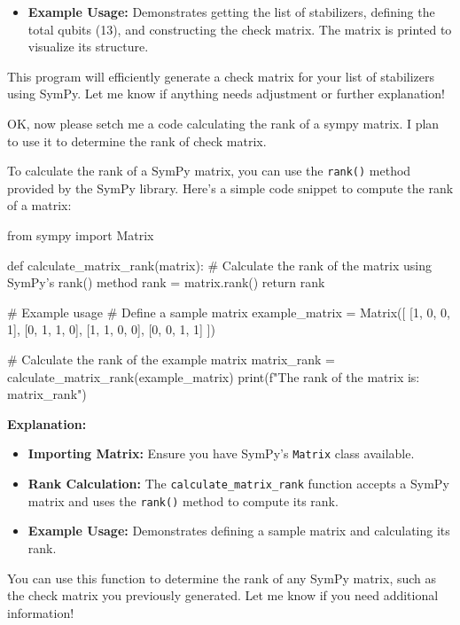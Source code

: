 \begin{airesult}
\begin{itemize}
  \item \textbf{Example Usage:} Demonstrates getting the list of stabilizers, defining the total
        qubits (13), and constructing the check matrix. The matrix is printed to visualize its
        structure.
\end{itemize}

This program will efficiently generate a check matrix for your list of stabilizers using SymPy. Let
me know if anything needs adjustment or further explanation!
\end{airesult}

\begin{ai}
OK, now please setch me a code calculating the rank of a sympy matrix. I plan to use it to determine
the rank of check matrix.
\end{ai}

\begin{airesult}
To calculate the rank of a SymPy matrix, you can use the \verb|rank()| method provided by the SymPy
library. Here's a simple code snippet to compute the rank of a matrix:

\begin{python}
from sympy import Matrix

def calculate_matrix_rank(matrix):
  # Calculate the rank of the matrix using SymPy's rank() method
  rank = matrix.rank()
  return rank

# Example usage
# Define a sample matrix
example_matrix = Matrix([
  [1, 0, 0, 1],
  [0, 1, 1, 0],
  [1, 1, 0, 0],
  [0, 0, 1, 1]
])

# Calculate the rank of the example matrix
matrix_rank = calculate_matrix_rank(example_matrix)
print(f"The rank of the matrix is: {matrix_rank}")
\end{python}

\vsp

\textbf{Explanation:}

\begin{itemize}
  \item \textbf{Importing Matrix:} Ensure you have SymPy's \verb|Matrix| class available.
  \item \textbf{Rank Calculation:} The \verb|calculate_matrix_rank| function accepts a SymPy matrix
and uses the \verb|rank()| method to compute its rank.
  \item \textbf{Example Usage:} Demonstrates defining a sample matrix and calculating its rank.
\end{itemize}

You can use this function to determine the rank of any SymPy matrix, such as the check matrix you
previously generated. Let me know if you need additional information!
\end{airesult}
